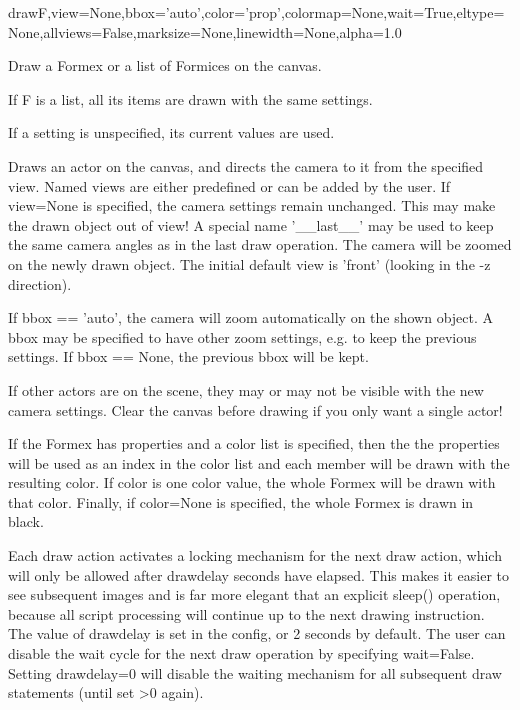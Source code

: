 \begin{funcdesc}{draw}{F,view=None,bbox='auto',color='prop',colormap=None,wait=True,eltype=None,allviews=False,marksize=None,linewidth=None,alpha=1.0}

Draw a Formex or a list of Formices on the canvas.

    If F is a list, all its items are drawn with the same settings.

    If a setting is unspecified, its current values are used.
    
    Draws an actor on the canvas, and directs the camera to it from
    the specified view. Named views are either predefined or can be added by
    the user.
    If view=None is specified, the camera settings remain unchanged.
    This may make the drawn object out of view!
    A special name '__last__' may be used to keep the same camera angles
    as in the last draw operation. The camera will be zoomed on the newly
    drawn object.
    The initial default view is 'front' (looking in the -z direction).

    If bbox == 'auto', the camera will zoom automatically on the shown
    object. A bbox may be specified to have other zoom settings, e.g. to
    keep the previous settings. If bbox == None, the previous bbox will be
    kept.

    If other actors are on the scene, they may or may not be visible with the
    new camera settings. Clear the canvas before drawing if you only want
    a single actor!

    If the Formex has properties and a color list is specified, then the
    the properties will be used as an index in the color list and each member
    will be drawn with the resulting color.
    If color is one color value, the whole Formex will be drawn with
    that color.
    Finally, if color=None is specified, the whole Formex is drawn in black.
    
    Each draw action activates a locking mechanism for the next draw action,
    which will only be allowed after drawdelay seconds have elapsed. This
    makes it easier to see subsequent images and is far more elegant that an
    explicit sleep() operation, because all script processing will continue
    up to the next drawing instruction.
    The value of drawdelay is set in the config, or 2 seconds by default.
    The user can disable the wait cycle for the next draw operation by
    specifying wait=False. Setting drawdelay=0 will disable the waiting
    mechanism for all subsequent draw statements (until set >0 again).

\end{funcdesc}


